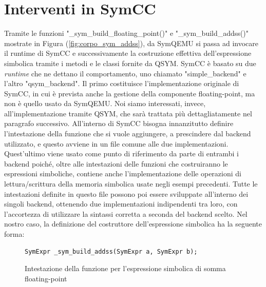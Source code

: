 \documentclass[Lau, oneside]{sapthesis}%
\begin{document}
\section{Interventi in SymCC}
Tramite le funzioni "\_sym\_build\_floating\_point()" e "\_sym\_build\_addss()" mostrate in Figura (\ref{fig:corpo_sym_addss}), da SymQEMU si passa ad invocare il runtime di SymCC e successivamente la costruzione effettiva dell'espressione simbolica tramite i metodi e le classi fornite da QSYM.
\newline \newline
SymCC è basato su due \textit{runtime} che ne dettano il comportamento, uno chiamato "simple\_backend" e l'altro "qsym\_backend".
\newline
Il primo costituisce l'implementazione originale di SymCC, in cui è prevista anche la gestione della componente floating-point, ma non è quello usato da SymQEMU.
\newline
Noi siamo interessati, invece, all'implementazione tramite QSYM, che sarà trattata più dettagliatamente nel paragrafo successivo.
\newline \newline
All'interno di SymCC bisogna innanzitutto definire l'intestazione della funzione che si vuole aggiungere, a prescindere dal backend utilizzato, e questo avviene in un file comune alle due implementazioni.
\newline
Quest'ultimo viene usato come punto di riferimento da parte di entrambi i backend poiché, oltre alle intestazioni delle funzioni che costruiranno le espressioni simboliche, contiene anche l'implementazione delle operazioni di lettura/scrittura della memoria simbolica usate negli esempi precedenti.
\newline
Tutte le intestazioni definite in questo file possono poi essere sviluppate all'interno dei singoli backend, ottenendo due implementazioni indipendenti tra loro, con l'accortezza di utilizzare la sintassi corretta a seconda del backend scelto.
\newline \newline
Nel nostro caso, la definizione del costruttore dell'espressione simbolica ha la seguente forma:
\begin{figure}[h]
\begin{lstlisting}[xleftmargin=0.1225\textwidth, language=SymQEMU]
SymExpr _sym_build_addss(SymExpr a, SymExpr b);
\end{lstlisting}
    \caption{Intestazione della funzione per l'espressione simbolica di somma floating-point}
    \label{fig:symcc_addss}
\end{figure}
\end{document}
